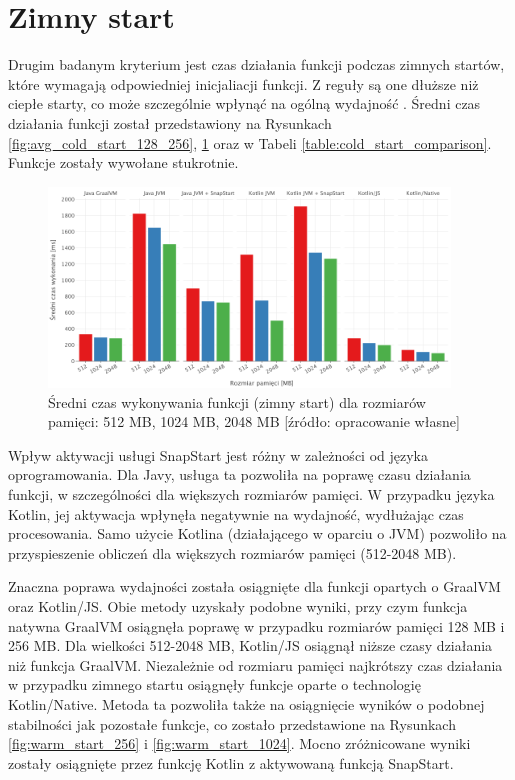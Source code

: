 \newpage
\section{Zimny start}\label{chapter:results_cold_start}

Drugim badanym kryterium jest czas działania funkcji podczas zimnych startów, które wymagają odpowiedniej inicjaliacji funkcji.
Z reguły są one dłuższe niż ciepłe starty, co może szczególnie wpłynąć na ogólną wydajność \cite{9284261}\cite{8605777}.
Średni czas działania funkcji został przedstawiony na Rysunkach \ref{fig:avg_cold_start_128_256}, \ref{fig:avg_cold_start_512_2045} oraz w Tabeli \ref{table:cold_start_comparison}.
Funkcje zostały wywołane stukrotnie.

\begin{figure}[!h]
    \centering
    \includegraphics[width=0.95\textwidth]{charts/results/avg-cold-start-512-2048.png}
    \caption{Średni czas wykonywania funkcji (zimny start) dla rozmiarów pamięci: 512 MB, 1024 MB, 2048 MB  [źródło: opracowanie własne]}
    \label{fig:avg_cold_start_512_2045}
\end{figure}

Wpływ aktywacji usługi SnapStart jest różny w zależności od języka oprogramowania.
Dla Javy, usługa ta pozwoliła na poprawę czasu działania funkcji, w szczególności dla większych rozmiarów pamięci.
W przypadku języka Kotlin, jej aktywacja wpłynęła negatywnie na wydajność, wydłużając czas procesowania.
Samo użycie Kotlina (działającego w oparciu o JVM) pozwoliło na przyspieszenie obliczeń dla większych rozmiarów pamięci (512-2048 MB).

Znaczna poprawa wydajności została osiągnięte dla funkcji opartych o GraalVM oraz Kotlin/JS.
Obie metody uzyskały podobne wyniki, przy czym funkcja natywna GraalVM osiągnęła poprawę w przypadku rozmiarów pamięci 128 MB i 256 MB.
Dla wielkości 512-2048 MB, Kotlin/JS osiągnął niższe czasy działania niż funkcja GraalVM.
Niezależnie od rozmiaru pamięci najkrótszy czas działania w przypadku zimnego startu osiągnęły funkcje oparte o technologię Kotlin/Native.
Metoda ta pozwoliła także na osiągnięcie wyników o podobnej stabilności jak pozostałe funkcje, co zostało przedstawione na Rysunkach \ref{fig:warm_start_256} i \ref{fig:warm_start_1024}.
Mocno zróżnicowane wyniki zostały osiągnięte przez funkcję Kotlin z aktywowaną funkcją SnapStart.

